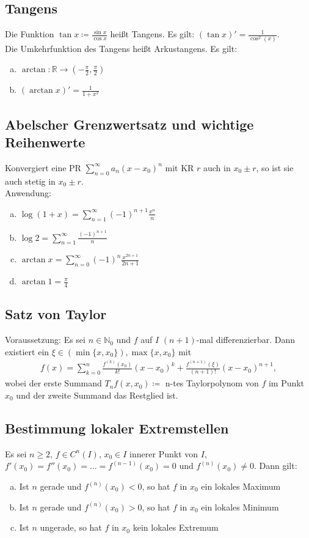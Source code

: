 \subsection{Tangens}
Die Funktion $\tan x \coloneqq \frac{\sin x}{\cos x}$ heißt Tangens. Es gilt: $(\tan x)' = \frac{1}{\cos^2(x)}$. \\
Die Umkehrfunktion des Tangens heißt Arkustangens. Es gilt: 
\begin{enumerate}[a)]
    \item $\arctan: \mathbb{R} \to (-\frac{\pi}{2},\frac{\pi}{2})$
    \item $(\arctan x)' = \frac{1}{1+x^2}$
\end{enumerate}

\subsection{Abelscher Grenzwertsatz und wichtige Reihenwerte}
Konvergiert eine PR $\sum \limits_{n=0}^{\infty} a_n(x-x_0)^n$ mit KR $r$ auch in $x_0 \pm r$, so ist sie auch stetig in $x_0 \pm r$. \\
Anwendung:
\begin{enumerate} [a)]
    \item $\log(1+x) = \sum \limits_{n=1}^{\infty} (-1)^{n+1} \frac{x^n}{n}$
    \item $\log 2 = \sum \limits_{n=1}^{\infty} \frac{(-1)^{n+1}}{n}$
    \item $\arctan x = \sum \limits_{n=0}^{\infty} (-1)^n \frac{x^{2n+1}}{2n+1}$
    \item $\arctan 1 = \frac{\pi}{4}$
\end{enumerate}


\subsection{Satz von Taylor}
Voraussetzung: Es sei $n \in \mathbb{N}_0$ und $f$ auf $I$ $(n+1)$-mal differenzierbar. Dann existiert ein $\xi \in (\min\{x,x_0\}),\max\{x,x_0\}$ mit 
\begin{align*}
    f(x) = \sum \limits_{k=0}^{n} \frac{f^{(k)}(x_0)}{k!} (x-x_0)^k + \frac{f^{(n+1)} (\xi)}{(n+1)!} (x-x_0)^{n+1},
\end{align*}
wobei der erste Summand $T_n f(x,x_0) \coloneqq$ n-tes Taylorpolynom von $f$ im Punkt $x_0$ und der zweite Summand das Restglied ist.

\subsection{Bestimmung lokaler Extremstellen}
Es sei $n \geq 2 \text{, } f \in C^n(I) \text{, } x_0 \in I$ innerer Punkt von $I$, $f'(x_0) = f''(x_0)=\ldots=f^{(n-1)}(x_0)=0$ und $f^{(n)}(x_0) \neq 0$.
Dann gilt:
\begin{enumerate} [a)]
    \item Ist $n$ gerade und $f^{(n)}(x_0)<0$, so hat $f$ in $x_0$ ein lokales Maximum
    \item Ist $n$ gerade und $f^{(n)}(x_0)>0$, so hat $f$ in $x_0$ ein lokales Minimum
    \item Ist $n$ ungerade, so hat $f$ in $x_0$ kein lokales Extremum
\end{enumerate}